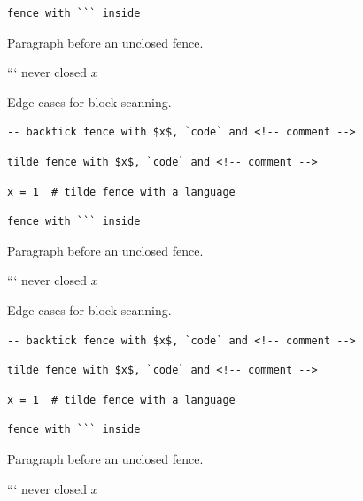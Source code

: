 \begin{verbatim}
fence with ``` inside
\end{verbatim}

Paragraph before an unclosed fence.

```
never closed $x$ %

\begin{frame}[t,fragile]
Edge cases for block scanning.

\begin{verbatim}
-- backtick fence with $x$, `code` and <!-- comment -->
\end{verbatim}

\begin{verbatim}
tilde fence with $x$, `code` and <!-- comment -->
\end{verbatim}

\begin{verbatim}
x = 1  # tilde fence with a language
\end{verbatim}

\begin{verbatim}
fence with ``` inside
\end{verbatim}

Paragraph before an unclosed fence.

```
never closed $x$ %

\end{frame}

\begin{frame}[t,fragile]
Edge cases for block scanning.

\begin{verbatim}
-- backtick fence with $x$, `code` and <!-- comment -->
\end{verbatim}

\begin{verbatim}
tilde fence with $x$, `code` and <!-- comment -->
\end{verbatim}

\begin{verbatim}
x = 1  # tilde fence with a language
\end{verbatim}

\begin{verbatim}
fence with ``` inside
\end{verbatim}

Paragraph before an unclosed fence.

```
never closed $x$ %

\end{frame}

